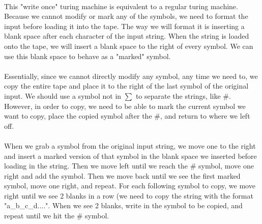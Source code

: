 \documentclass{article}
\begin{document}
\begin{enumerate}[\indent a)]
    \paragraph{} This "write once" turing machine is equivalent to a regular turing machine. Because we cannot modify or mark any of the symbols, we need to format the input before loading it into the tape.
The way we will format it is inserting a blank space after each character of the input string. When the string is loaded onto the tape, we will insert a blank space to the right of every symbol. We can use this blank space to behave as a "marked" symbol.
\\\\Essentially, since we cannot directly modify any symbol, any time we need to, we copy the entire tape and place it to the right of the last symbol of the original input. We should use a symbol not in $\sum$ to separate the strings, like \#. 
However, in order to copy, we need to be able to mark the current symbol we want to copy, place the copied symbol after the \#, and return to where we left off.
\\\\When we grab a symbol from the original input string, we move one to the right and insert a marked version of that symbol in the blank space we inserted before loading in the string. Then we move left until we reach the \# symbol, move one right and add the symbol. Then we move back until we see the first marked symbol, move one right, and repeat.
For each following symbol to copy, we move right until we see 2 blanks in a row (we need to copy the string with the format "a\_b\_c\_d....". When we see 2 blanks, write in the symbol to be copied, and repeat until we hit the \# symbol.
    
\end{enumerate}
\end{document}
